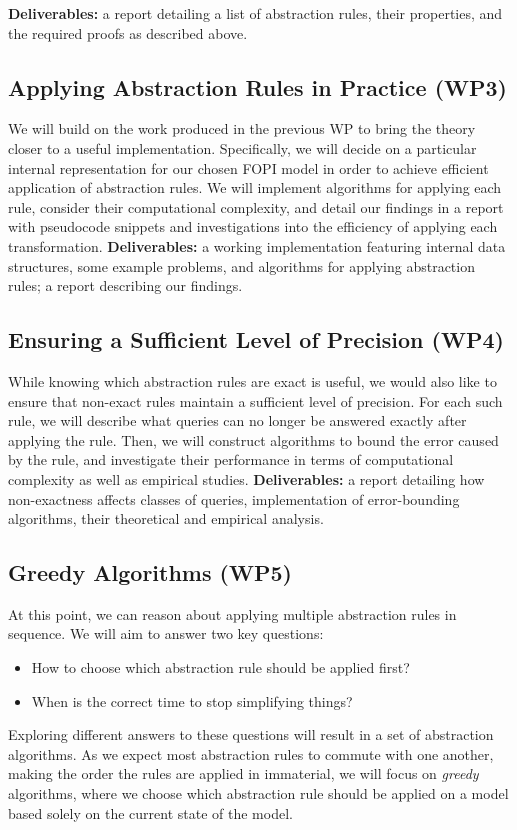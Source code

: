 \documentclass{article}
\begin{document}
\textbf{Deliverables:} a report detailing a list of abstraction rules, their
properties, and the required proofs as described above.

\subsection{Applying Abstraction Rules in Practice (WP3)}

We will build on the work produced in the previous WP to bring the theory closer
to a useful implementation. Specifically, we will decide on a particular
internal representation for our chosen FOPI model in order to achieve efficient
application of abstraction rules. We will implement algorithms for applying each
rule, consider their computational complexity, and detail our findings in a
report with pseudocode snippets and investigations into the efficiency of
applying each transformation. \textbf{Deliverables:} a working implementation
featuring internal data structures, some example problems, and algorithms for
applying abstraction rules; a report describing our findings.

\subsection{Ensuring a Sufficient Level of Precision (WP4)}

While knowing which abstraction rules are exact is useful, we would also
like to ensure that non-exact rules maintain a sufficient level of precision.
For each such rule, we will describe what queries can no longer be answered
exactly after applying the rule. Then, we will construct algorithms to bound the
error caused by the rule, and investigate their performance in terms of
computational complexity as well as empirical studies. \textbf{Deliverables:} a
report detailing how non-exactness affects classes of queries, implementation of
error-bounding algorithms, their theoretical and empirical analysis.

\subsection{Greedy Algorithms (WP5)}

At this point, we can reason about applying multiple abstraction rules in
sequence. We will aim to answer two key questions:
\begin{itemize}
\item How to choose which abstraction rule should be applied first?
\item When is the correct time to stop simplifying things?
\end{itemize}
Exploring different answers to these questions will result in a set of
abstraction algorithms. As we expect most abstraction rules to commute with one
another, making the order the rules are applied in immaterial, we will focus on
\emph{greedy} algorithms, where we choose which abstraction rule should be
applied on a model based solely on the current state of the model.
\end{document}
